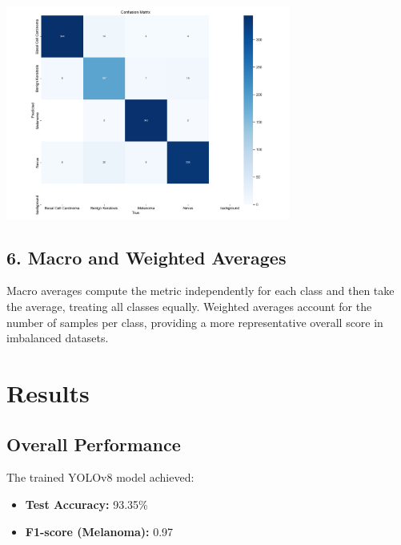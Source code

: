 \documentclass[a4paper,12pt]{report}
\begin{document}
\begin{spacing}{1.5}
    \begin{center}
        \includegraphics[width=0.7\textwidth]{Pics/confusion_matrix.png}
    \end{center}

    \subsection*{6. Macro and Weighted Averages}
    Macro averages compute the metric independently for each class and then take the average, treating all classes equally. Weighted averages account for the number of samples per class, providing a more representative overall score in imbalanced datasets.

    
    \section{Results}
    
    \subsection*{Overall Performance}
     The trained YOLOv8 model achieved:
     \begin{itemize}
          \item \textbf{Test Accuracy:} 93.35\%
          \item \textbf{F1-score (Melanoma):} 0.97
     \end{itemize}
     

\end{spacing}
\end{document}
